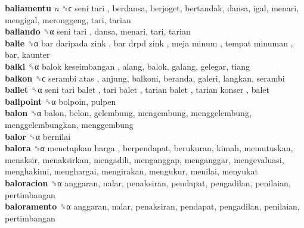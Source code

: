 \textbf{baliamentu} \emph{n}  ␝ϲ   seni tari , berdansa, berjoget, bertandak, dansa, igal, menari, mengigal, meronggeng, tari, tarian  \\
\textbf{baliando} ␝α   seni tari , dansa, menari, tari, tarian  \\
\textbf{balie} ␝α   bar daripada zink ,  bar drpd zink ,  meja minum ,  tempat minuman , bar, kaunter  \\
\textbf{balki} ␝α   balok keseimbangan , alang, balok, galang, gelegar, tiang  \\
\textbf{balkon} ␝ϲ   serambi atas , anjung, balkoni, beranda, galeri, langkan, serambi  \\
\textbf{ballet} ␝α   seni tari balet ,  tari balet ,  tarian balet ,  tarian konser , balet  \\
\textbf{ballpoint} ␝α  bolpoin, pulpen  \\
\textbf{balon} ␝α  balon, belon, gelembung, mengembung, menggelembung, menggelembungkan, menggembung  \\
\textbf{balor} ␝α  bernilai  \\
\textbf{balora} ␝α   menetapkan harga , berpendapat, berukuran, kimah, memutuskan, menaksir, menaksirkan, mengadili, menganggap, menganggar, mengevaluasi, menghakimi, menghargai, mengirakan, mengukur, menilai, menyukat  \\
\textbf{baloracion} ␝α  anggaran, nalar, penaksiran, pendapat, pengadilan, penilaian, pertimbangan  \\
\textbf{baloramento} ␝α  anggaran, nalar, penaksiran, pendapat, pengadilan, penilaian, pertimbangan  \\
